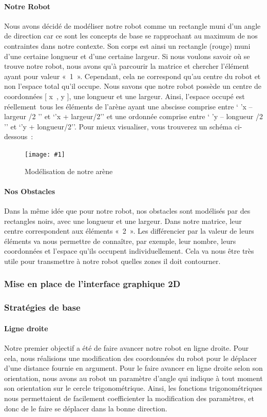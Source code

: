 \documentclass[12pt]{article}
\newcommand\img[2]{
\begin{figure}[!h]
  \centering
    \texttt{[image: \#1]}
  \caption{#2}
  \label{img:#1}
\end{figure}
}
\begin{document}
\paragraph{Notre Robot\\}
Nous avons décidé de modéliser notre robot comme un rectangle muni d’un angle de direction car ce sont les concepts de base se rapprochant au maximum de nos contraintes dans notre contexte. Son corps est ainsi un rectangle (rouge) muni d’une certaine longueur et d’une certaine largeur. Si nous voulons savoir où se trouve notre robot, nous avons qu’à parcourir la matrice et chercher l’élément ayant pour valeur « 1 ». Cependant, cela ne correspond qu’au centre du robot et non l’espace total qu’il occupe. Nous savons que notre robot possède un centre de coordonnées [ x , y ], une longueur et une largeur. Ainsi, l’espace occupé est réellement tous les éléments de l’arène ayant une abscisse comprise entre ‘ ’x – largeur /2 ’’ et ‘’x + largeur/2’’ et une ordonnée comprise entre ‘ ’y – longueur /2 ’’ et ‘’y + longueur/2’’. Pour mieux visualiser, vous trouverez un schéma ci-dessous :

\img{Images/Robot.png}{Modélisation de notre arène}

\paragraph{Nos Obstacles\\}
Dans la même idée que pour notre robot, nos obstacles sont modélisés par des rectangles noirs, avec une longueur et une largeur. Dans notre matrice, leur centre correspondent aux éléments « 2 ». Les différencier par la valeur de leurs éléments va nous permettre de connaître, par exemple, leur nombre, leurs coordonnées et l’espace qu’ils occupent individuellement. Cela va nous être très utile pour transmettre à notre robot quelles zones il doit contourner.

\subsubsection{Mise en place de l'interface graphique 2D}

\subsubsection{Stratégies de base}
\paragraph{Ligne droite\\}
Notre premier objectif a été de faire avancer notre robot en ligne droite. Pour cela, nous réalisions une modification des coordonnées du robot pour le déplacer d'une distance fournie en argument. Pour le faire avancer en ligne droite selon son orientation, nous avons au robot un paramètre d'angle qui indique à tout moment son orientation sur le cercle trigonométrique. Ainsi, les fonctions trigonométriques nous permettaient de facilement coefficienter la modification des paramètres, et donc de le faire se déplacer dans la bonne direction.
\end{document}
